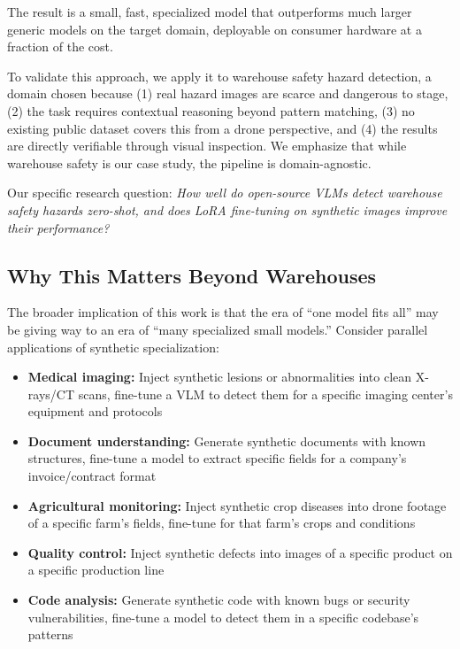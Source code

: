 \documentclass[12pt, a4paper]{article}
\begin{document}
The result is a small, fast, specialized model that outperforms much larger generic models on the target domain, deployable on consumer hardware at a fraction of the cost.

To validate this approach, we apply it to warehouse safety hazard detection, a domain chosen because (1) real hazard images are scarce and dangerous to stage, (2) the task requires contextual reasoning beyond pattern matching, (3) no existing public dataset covers this from a drone perspective, and (4) the results are directly verifiable through visual inspection. We emphasize that while warehouse safety is our case study, the pipeline is domain-agnostic.

Our specific research question: \textit{How well do open-source VLMs detect warehouse safety hazards zero-shot, and does LoRA fine-tuning on synthetic images improve their performance?}

\subsection{Why This Matters Beyond Warehouses}

The broader implication of this work is that the era of ``one model fits all'' may be giving way to an era of ``many specialized small models.'' Consider parallel applications of synthetic specialization:

\begin{itemize}
    \item \textbf{Medical imaging:} Inject synthetic lesions or abnormalities into clean X-rays/CT scans, fine-tune a VLM to detect them for a specific imaging center's equipment and protocols
    \item \textbf{Document understanding:} Generate synthetic documents with known structures, fine-tune a model to extract specific fields for a company's invoice/contract format
    \item \textbf{Agricultural monitoring:} Inject synthetic crop diseases into drone footage of a specific farm's fields, fine-tune for that farm's crops and conditions
    \item \textbf{Quality control:} Inject synthetic defects into images of a specific product on a specific production line
    \item \textbf{Code analysis:} Generate synthetic code with known bugs or security vulnerabilities, fine-tune a model to detect them in a specific codebase's patterns
\end{itemize}
\end{document}
